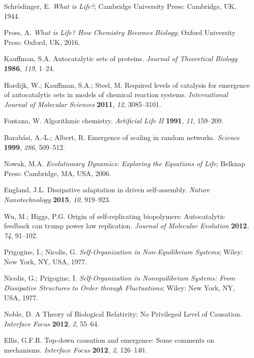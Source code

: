 \documentclass[preprint,12pt]{elsarticle}
\begin{document}
\begin{thebibliography}{999}
Schrödinger, E. \textit{What is Life?}; Cambridge University Press: Cambridge, UK, 1944.

Pross, A. \textit{What is Life? How Chemistry Becomes Biology}; Oxford University Press: Oxford, UK, 2016.

Kauffman, S.A. Autocatalytic sets of proteins. \textit{Journal of Theoretical Biology} \textbf{1986}, \textit{119}, 1–24.

Hordijk, W.; Kauffman, S.A.; Steel, M. Required levels of catalysis for emergence of autocatalytic sets in models of chemical reaction systems. \textit{International Journal of Molecular Sciences} \textbf{2011}, \textit{12}, 3085–3101.

Fontana, W. Algorithmic chemistry. \textit{Artificial Life II} \textbf{1991}, \textit{11}, 159–209.

Barabási, A.-L.; Albert, R. Emergence of scaling in random networks. \textit{Science} \textbf{1999}, \textit{286}, 509–512.

Nowak, M.A. \textit{Evolutionary Dynamics: Exploring the Equations of Life}; Belknap Press: Cambridge, MA, USA, 2006.

England, J.L. Dissipative adaptation in driven self-assembly. \textit{Nature Nanotechnology} \textbf{2015}, \textit{10}, 919–923.

Wu, M.; Higgs, P.G. Origin of self-replicating biopolymers: Autocatalytic feedback can trump power law replication. \textit{Journal of Molecular Evolution} \textbf{2012}, \textit{74}, 91–102.

Prigogine, I.; Nicolis, G. \textit{Self-Organization in Non-Equilibrium Systems}; Wiley: New York, NY, USA, 1977.

Nicolis, G.; Prigogine, I. \textit{Self-Organization in Nonequilibrium Systems: From Dissipative Structures to Order through Fluctuations}; Wiley: New York, NY, USA, 1977.

Noble, D. A Theory of Biological Relativity: No Privileged Level of Causation. \textit{Interface Focus} \textbf{2012}, \textit{2}, 55–64.

Ellis, G.F.R. Top-down causation and emergence: Some comments on mechanisms. \textit{Interface Focus} \textbf{2012}, \textit{2}, 126–140.


\end{thebibliography}
\end{document}
